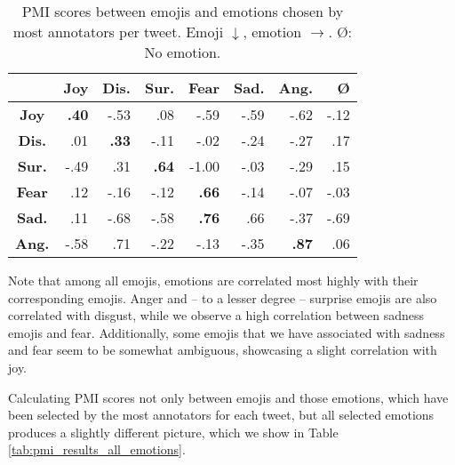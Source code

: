 \documentclass[10pt, a4paper]{article}
\begin{document}
\begin{table}[!ht]
\centering
\begin{tabular}{c | r | r | r | r%
%
%
 | r | r | r}
 & \textbf{Joy} & \textbf{Dis.} & \textbf{Sur.} & \textbf{Fear} & \textbf{Sad.} & \textbf{Ang.} & \textbf{\O} \\\hline
\textbf{Joy} & \textbf{.40} & -.53 & .08 & -.59 & -.59 & -.62 & -.12 \\
\textbf{Dis.} & .01 & \textbf{.33} & -.11 & -.02 & -.24 & -.27 & .17 \\
\textbf{Sur.} & -.49 & .31 & \textbf{.64} & -1.00 & -.03 & -.29 & .15 \\
\textbf{Fear} & .12 & -.16 & -.12 & \textbf{.66} & -.14 & -.07 & -.03 \\
\textbf{Sad.} & .11 & -.68 & -.58 & \textbf{.76} & .66 & -.37 & -.69 \\
\textbf{Ang.} & -.58 & .71 & -.22 & -.13 & -.35 & \textbf{.87} & .06
\end{tabular}
\caption{PMI scores between emojis and emotions chosen by most annotators per tweet. Emoji $\downarrow$, emotion $\rightarrow$. \O: No emotion.}
\label{tab:pmi_results_top_emotions}
\end{table}

Note that among all emojis, emotions are correlated most highly with their corresponding emojis. Anger and -- to a lesser degree -- surprise emojis are also correlated with disgust, while we observe a high correlation between sadness emojis and fear. Additionally, some emojis that we have associated with sadness and fear seem to be somewhat ambiguous, showcasing a slight correlation with joy.

Calculating PMI scores not only between emojis and those emotions, which have been selected by the most annotators for each tweet, but all selected emotions produces a slightly different picture, which we show in Table \ref{tab:pmi_results_all_emotions}.
\end{document}
